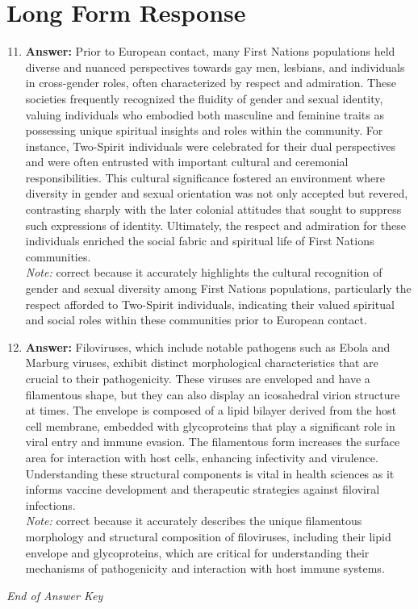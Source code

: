 \documentclass[12pt]{article}
\begin{document}
\section*{Long Form Response}
\begin{enumerate}[label=\arabic*.]
\setcounter{enumi}{10}
\item \textbf{Answer:} Prior to European contact, many First Nations populations held diverse and nuanced perspectives towards gay men, lesbians, and individuals in cross-gender roles, often characterized by respect and admiration. These societies frequently recognized the fluidity of gender and sexual identity, valuing individuals who embodied both masculine and feminine traits as possessing unique spiritual insights and roles within the community. For instance, Two-Spirit individuals were celebrated for their dual perspectives and were often entrusted with important cultural and ceremonial responsibilities. This cultural significance fostered an environment where diversity in gender and sexual orientation was not only accepted but revered, contrasting sharply with the later colonial attitudes that sought to suppress such expressions of identity. Ultimately, the respect and admiration for these individuals enriched the social fabric and spiritual life of First Nations communities.
\\ \textit{Note:} correct because it accurately highlights the cultural recognition of gender and sexual diversity among First Nations populations, particularly the respect afforded to Two-Spirit individuals, indicating their valued spiritual and social roles within these communities prior to European contact.
\item \textbf{Answer:} Filoviruses, which include notable pathogens such as Ebola and Marburg viruses, exhibit distinct morphological characteristics that are crucial to their pathogenicity. These viruses are enveloped and have a filamentous shape, but they can also display an icosahedral virion structure at times. The envelope is composed of a lipid bilayer derived from the host cell membrane, embedded with glycoproteins that play a significant role in viral entry and immune evasion. The filamentous form increases the surface area for interaction with host cells, enhancing infectivity and virulence. Understanding these structural components is vital in health sciences as it informs vaccine development and therapeutic strategies against filoviral infections.
\\ \textit{Note:} correct because it accurately describes the unique filamentous morphology and structural composition of filoviruses, including their lipid envelope and glycoproteins, which are critical for understanding their mechanisms of pathogenicity and interaction with host immune systems.
\end{enumerate}

\vfill
\noindent\textit{End of Answer Key}
\end{document}
